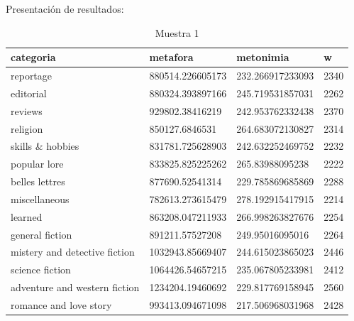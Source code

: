 \documentclass[twoside]{article}
\begin{document}
Presentación de resultados:
\begin{center}
    \begin{longtable}{| p{} | p{} | p{}|p{}|}
    \caption{Muestra 1}
    \hline
        categoria & metafora & metonimia & w \\ \hline
        reportage & 880514.226605173 & 232.266917233093 & 2340 \\ \hline
        editorial & 880324.393897166 & 245.719531857031 & 2262 \\ \hline
        reviews & 929802.38416219 & 242.953762332438 & 2370 \\ \hline
        religion & 850127.6846531 & 264.683072130827 & 2314 \\ \hline
        skills \& hobbies & 831781.725628903 & 242.632252469752 & 2232 \\ \hline
        popular lore & 833825.825225262 & 265.83988095238 & 2222 \\ \hline
        belles lettres & 877690.52541314 & 229.785869685869 & 2288 \\ \hline
        miscellaneous & 782613.273615479 & 278.192915417915 & 2214 \\ \hline
        learned & 863208.047211933 & 266.998263827676 & 2254 \\ \hline
        general fiction & 891211.57527208 & 249.95016095016 & 2264 \\ \hline
        mistery and detective fiction & 1032943.85669407 & 244.615023865023 & 2446 \\ \hline
        science fiction & 1064426.54657215 & 235.067805233981 & 2412 \\ \hline
        adventure and western fiction & 1234204.19460692 & 229.817769158945 & 2560 \\ \hline
        romance and love story & 993413.094671098 & 217.506968031968 & 2428 \\ \hline
\end{longtable}
\label{muestra1}
\end{center}
\end{document}
